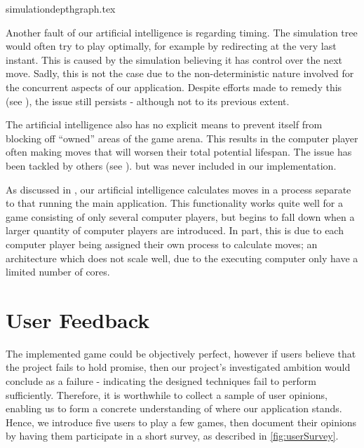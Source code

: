 \documentclass{standalone}
\begin{document}
		{simulationdepthgraph.tex}
		\FloatBarrier

		Another fault of our artificial intelligence is regarding timing. The simulation tree would often try to play optimally, for example by redirecting at the very last instant. This is caused by the simulation believing it has control over the next move. Sadly, this is not the case due to the non-deterministic nature involved for the concurrent aspects of our application. Despite efforts made to remedy this (see ), the issue still persists - although not to its previous extent.

		The artificial intelligence also has no explicit means to prevent itself from blocking off \enquote{owned} areas of the game arena. This results in the computer player often making moves that will worsen their total potential lifespan. The issue has been tackled by others (see ). but was never included in our implementation.

		As discussed in , our artificial intelligence calculates moves in a process separate to that running the main application. This functionality works quite well for a game consisting of only several computer players, but begins to fall down when a larger quantity of computer players are introduced. In part, this is due to each computer player being assigned their own process to calculate moves; an architecture which does not scale well, due to the executing computer only have a limited number of cores.

	\section{User Feedback} \label{sec:userFeedback}
		The implemented game could be objectively perfect, however if users believe that the project fails to hold promise, then our project's investigated ambition would conclude as a failure - indicating the designed techniques fail to perform sufficiently. Therefore, it is worthwhile to collect a sample of user opinions, enabling us to form a concrete understanding of where our application stands. Hence, we introduce five users to play a few games, then document their opinions by having them participate in a short survey, as described in \autoref{fig:userSurvey}.
\end{document}
